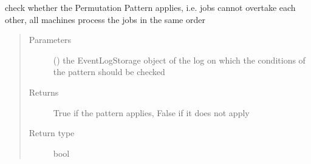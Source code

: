\documentclass[letterpaper,10pt,english]{sphinxmanual}
\begin{document}
\begin{fulllineitems}
\begin{fulllineitems}
\label{\detokenize{event_log_analyzer:event_log_analyzer.pattern_library.manufacturing_scheduling_patterns.Permutation.pattern_applies}}
\sphinxAtStartPar
check whether the Permutation Pattern applies, i.e. jobs cannot overtake each other, all machines process the jobs in the same order
\begin{quote}\begin{description}
\item[{Parameters}] \leavevmode
\sphinxAtStartPar
{} ({\hyperref[\detokenize{event_log_analyzer:event_log_analyzer.event_log.EventLogStorage}]{}}) \textendash{} the EventLogStorage object of the log on which the conditions of the pattern should be checked

\item[{Returns}] \leavevmode
\sphinxAtStartPar
True if the pattern applies, False if it does not apply

\item[{Return type}] \leavevmode
\sphinxAtStartPar
bool

\end{description}\end{quote}

\end{fulllineitems}


\end{fulllineitems}

\end{document}
